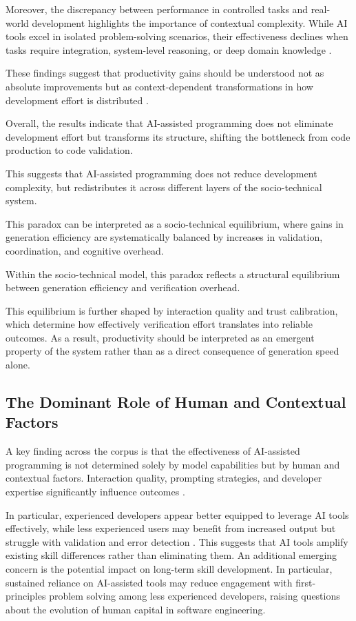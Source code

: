 \documentclass[conference]{IEEEtran}
\begin{document}
Moreover, the discrepancy between performance in controlled tasks and real-world development highlights the importance of contextual complexity. While AI tools excel in isolated problem-solving scenarios, their effectiveness declines when tasks require integration, system-level reasoning, or deep domain knowledge \cite{corso_generating_2024, pandey_transforming_2024, wang_rocks_2024, eibl_exploring_2025}.

These findings suggest that productivity gains should be understood not as absolute improvements but as context-dependent transformations in how development effort is distributed \cite{koripalli_copilot_2025, xu_ai-assisted_2026}.

Overall, the results indicate that AI-assisted programming does not eliminate development effort but transforms its structure, shifting the bottleneck from code production to code validation.

This suggests that AI-assisted programming does not reduce development complexity, but redistributes it across different layers of the socio-technical system.

This paradox can be interpreted as a socio-technical equilibrium, where gains in generation efficiency are systematically balanced by increases in validation, coordination, and cognitive overhead.

Within the socio-technical model, this paradox reflects a structural equilibrium between generation efficiency and verification overhead.

This equilibrium is further shaped by interaction quality and trust calibration, which determine how effectively verification effort translates into reliable outcomes. As a result, productivity should be interpreted as an emergent property of the system rather than as a direct consequence of generation speed alone.

\subsection{The Dominant Role of Human and Contextual Factors}

A key finding across the corpus is that the effectiveness of AI-assisted programming is not determined solely by model capabilities but by human and contextual factors. Interaction quality, prompting strategies, and developer expertise significantly influence outcomes \cite{zhong_developer-llm_2025, pinto_developer_2024}.

In particular, experienced developers appear better equipped to leverage AI tools effectively, while less experienced users may benefit from increased output but struggle with validation and error detection \cite{koripalli_copilot_2025}. This suggests that AI tools amplify existing skill differences rather than eliminating them. An additional emerging concern is the potential impact on long-term skill development. In particular, sustained reliance on AI-assisted tools may reduce engagement with first-principles problem solving among less experienced developers, raising questions about the evolution of human capital in software engineering.
\end{document}
